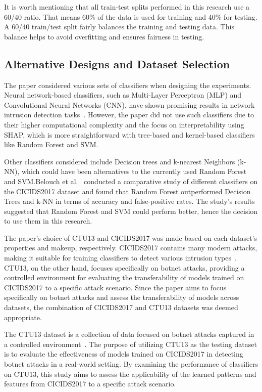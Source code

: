 It is worth mentioning that all train-test splits performed in this research use a 60/40 ratio. That means 60\% of the data is used for training and 40\% for testing. A 60/40 train/test split fairly balances the training and testing data. This balance helps to avoid overfitting and ensures fairness in testing. 

\subsection{Alternative Designs and Dataset Selection}
The paper considered various sets of classifiers when designing the experiments. Neural network-based classifiers, such as Multi-Layer Perceptron (MLP) and Convolutional Neural Networks (CNN), have shown promising results in network intrusion detection tasks~\cite{ustebay2018intrusion,pektacs2019deep}. However, the paper did not use such classifiers due to their higher computational complexity and the focus on interpretability using SHAP, which is more straightforward with tree-based and kernel-based classifiers like Random Forest and SVM.\@

Other classifiers considered include Decision trees and k-nearest Neighbors (k-NN), which could have been alternatives to the currently used Random Forest and SVM.\@ Belouch et al.~\cite{belouch2018performance} conducted a comparative study of different classifiers on the CICIDS2017 dataset and found that Random Forest outperformed Decision Trees and k-NN in terms of accuracy and false-positive rates. The study's results suggested that Random Forest and SVM could perform better, hence the decision to use them in this research.

The paper's choice of CTU13 and CICIDS2017 was made based on each dataset's properties and makeup, respectively. CICIDS2017 contains many modern attacks, making it suitable for training classifiers to detect various intrusion types~\cite{sharafaldin2018toward}. CTU13, on the other hand, focuses specifically on botnet attacks, providing a controlled environment for evaluating the transferability of models trained on CICIDS2017 to a specific attack scenario. Since the paper aims to focus specifically on botnet attacks and assess the transferability of models across datasets, the combination of CICIDS2017 and CTU13 datasets was deemed appropriate.

The CTU13 dataset is a collection of data focused on botnet attacks captured in a controlled environment~\cite{garcia2014empirical}.  The purpose of utilizing CTU13 as the testing dataset is to evaluate the effectiveness of models trained on CICIDS2017 in detecting botnet attacks in a real-world setting. By examining the performance of classifiers on CTU13, this study aims to assess the applicability of the learned patterns and features from CICIDS2017 to a specific attack scenario.

